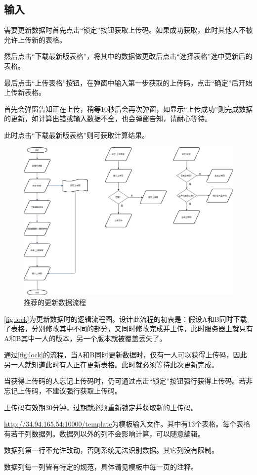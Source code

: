 \documentclass[UTF8,fontset=windowsnew]{ctexart}
\begin{document}
\subsection{输入}
需要更新数据时首先点击``锁定''按钮获取上传码。如果成功获取，此时其他人不被允许上传新的表格。\par
然后点击``下载最新版表格''，将其中的数据做更改后点击``选择表格''选中更新后的表格。\par
最后点击``上传表格''按钮，在弹窗中输入第一步获取的上传码，点击``确定''后开始上传新表格。\par
首先会弹窗告知正在上传，稍等10秒后会再次弹窗，如显示``上传成功''则完成数据的更新，如计算出错或输入数据不全，也会弹窗告知，请耐心等待。\par
此时点击``下载最新版表格''则可获取计算结果。\par
\begin{figure}[h]
  \centering
  \includegraphics[width=.8\textwidth]{image/lock.png}
  \caption{推荐的更新数据流程}
  \label{fig:lock}
\end{figure}
\autoref{fig:lock}为更新数据时的逻辑流程图。设计此流程的初衷是：假设A和B同时下载了表格，分别修改其中不同的部分，又同时修改完成并上传，此时服务器上就只有A和B其中一人的版本，另一个版本就被覆盖丢失了。\par
通过\autoref{fig:lock}的流程，当A和B同时更新数据时，仅有一人可以获得上传码，因此另一人就知道此时有人正在更新表格。此时就必须等待此次更新完成。\par
当获得上传码的人忘记上传码时，仍可通过点击``锁定''按钮强行获得上传码。若非忘记上传码，不建议强行获取上传码。\par
上传码有效期30分钟，过期就必须重新锁定并获取新的上传码。\par
\url{http://34.94.165.54:10000/template}为模板输入文件。其中有13个表格。每个表格有若干列数据列。数据列以外的列不会影响计算，可以随意编辑。\par
数据列第一行不允许改动，否则系统无法识别数据。其它列没有限制。\par
数据列每一列皆有特定的规范，具体请见模板中每一页的注释。
\end{document}
